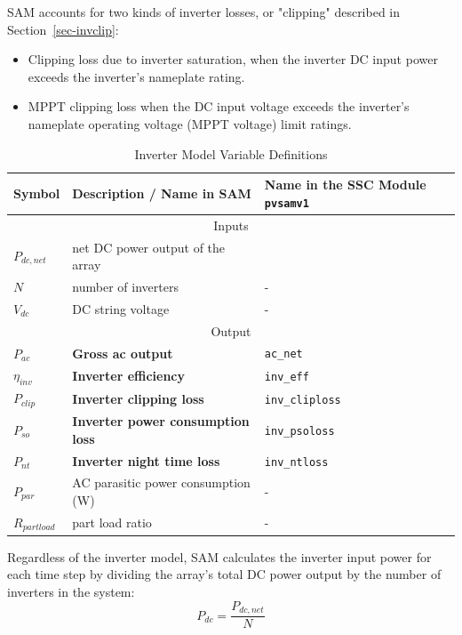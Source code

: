 \documentclass[12pt,letterpaper]{article}
\begin{document}
SAM accounts for two kinds of inverter losses, or "clipping" described in Section~\ref{sec-invclip}:

\begin{itemize}
\item Clipping loss due to inverter saturation, when the inverter DC input power exceeds the inverter's nameplate rating.
\item MPPT clipping loss when the DC input voltage exceeds the inverter's nameplate operating voltage (MPPT voltage) limit ratings.
\end{itemize}

\begin{table}
\begin{center}
\caption{Inverter Model Variable Definitions}
\begin{tabular}{lll}
\midrule
Symbol & Description / \textbf{Name in SAM} & Name in the SSC Module \texttt{pvsamv1}\\
\midrule
\multicolumn{3}{c}{Inputs}\\
$P_{dc,net}$ & net DC power output of the array & \\
$N$ & number of inverters & - \\
$V_{dc}$ & DC string voltage & - \\
\midrule
\multicolumn{3}{c}{Output}\\
$P_{ac}$ & \textbf{Gross ac output} & \texttt{ac\_net} \\
$\eta_{inv}$ & \textbf{Inverter efficiency} & \texttt{inv\_eff}  \\
$P_{clip}$ & \textbf{Inverter clipping loss} & \texttt{inv\_cliploss}  \\
$P_{so}$ & \textbf{Inverter power consumption loss}& \texttt{inv\_psoloss}  \\
$P_{nt}$ & \textbf{Inverter night time loss}& \texttt{inv\_ntloss}  \\
$P_{par}$ & AC parasitic power consumption (W) & - \\%
$R_{partload}$ & part load ratio & - \\
\midrule
\end{tabular}
\label{tab-invertervars}
\end{center}
\end{table}

Regardless of the inverter model, SAM calculates the inverter input power for each time step by dividing the array's total DC power output by the number of inverters in the system:
\begin{equation}\label{eqn-invinputpower}
P_{dc} = \frac{P_{dc,net}}{N}
\end{equation}
\end{document}

